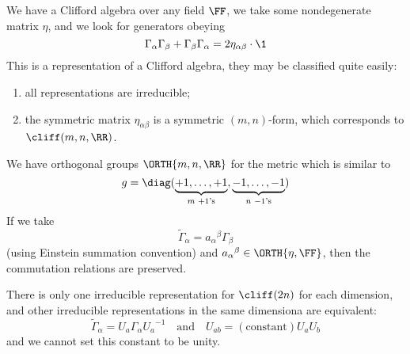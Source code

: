 We have a Clifford algebra over any field $\FF$, we take some
nondegenerate matrix $\eta$, and we look for generators obeying
\begin{equation}
\Gamma_{\alpha}\Gamma_{\beta}+\Gamma_{\beta}\Gamma_{\alpha}=2\eta_{\alpha\beta}\cdot\1
\end{equation}
This is a representation of a Clifford algebra, they may be
classified quite easily:
\begin{enumerate}
\item all representations are irreducible;
\item the symmetric matrix $\eta_{\alpha\beta}$ is a symmetric
  $(m,n)$-form, which corresponds to $\cliff(m,n,\RR)$.
\end{enumerate}
We have orthogonal groups $\ORTH{m,n,\RR}$ for the metric which
is similar to
\begin{equation}
g = \diag(\underbrace{+1,\dots,+1}_{\text{$m$
    $+1$'s}},\underbrace{-1,\dots,-1}_{\text{$n$ $-1$'s}})
\end{equation}
If we take
\begin{equation}
\widetilde\Gamma_{\alpha}={a_{\alpha}}^{\beta}\Gamma_{\beta}
\end{equation}
(using Einstein summation convention) and
${a_{\alpha}}^{\beta}\in\ORTH{\eta,\FF}$, then the commutation
relations are preserved.

\begin{ClassificationCliff}
There is only one irreducible representation for $\cliff(2n)$ for
each dimension, and other irreducible representations in the same
dimensiona are equivalent:
\begin{equation}
\widetilde{\Gamma}_{\alpha}=U_{a}\Gamma_{\alpha}{U_{a}}^{-1}\quad\mbox{and}\quad
U_{ab}=(\mbox{constant})U_{a}U_{b}
\end{equation}
and we cannot set this constant to be unity.
\end{ClassificationCliff}

